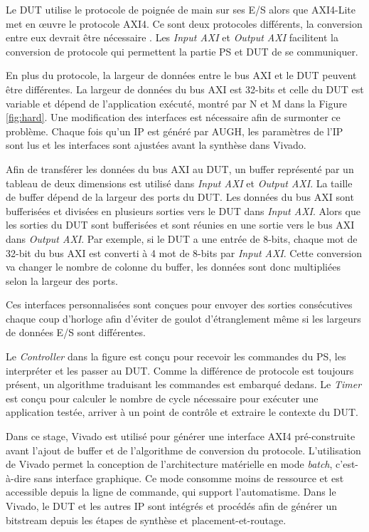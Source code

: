 Le DUT utilise le protocole de poignée de main sur ses E/S alors que AXI4-Lite met en œuvre le protocole AXI4.
Ce sont deux protocoles différents, la conversion entre eux devrait être nécessaire . Les \emph{Input AXI} et \emph{Output AXI}
facilitent la conversion de protocole qui permettent la partie PS et DUT de se communiquer. 

En plus du protocole, la largeur de données entre le bus AXI et le DUT peuvent être différentes.
La largeur de données du bus AXI est 32-bits et celle du DUT est variable et dépend de l'application
exécuté, montré par N et M dans la Figure \ref{fig:hard}. Une modification des interfaces est nécessaire afin
de surmonter ce problème. Chaque fois qu'un IP est généré par AUGH, les paramètres de l'IP sont
lus et les interfaces sont ajustées avant la synthèse dans Vivado. 

Afin de transférer les données du bus AXI au DUT, un buffer représenté par un tableau de deux dimensions est utilisé dans
\emph{Input AXI} et \emph{Output AXI}. La taille de buffer dépend de la largeur des ports du DUT. 
Les données du bus AXI sont bufferisées et divisées en plusieurs sorties vers le DUT dans \emph{Input AXI}.
Alors que les sorties du DUT sont bufferisées et sont réunies en une sortie vers le bus AXI dans \emph{Output AXI}.
Par exemple, si le DUT a une entrée de 8-bits, chaque mot de 32-bit du bus AXI est converti à 4 mot de 8-bits par 
\emph{Input AXI}. Cette conversion va changer le nombre de colonne du buffer, les données sont donc multipliées
selon la largeur des ports.

Ces interfaces personnalisées sont conçues pour envoyer des sorties consécutives chaque coup d'horloge
afin d'éviter de goulot d'étranglement même si les largeurs de données E/S sont différentes.

Le \emph{Controller} dans la figure est conçu pour recevoir les commandes du PS, les interpréter et les passer au DUT.
Comme la différence de protocole est toujours présent, un algorithme traduisant les commandes est embarqué dedans.
Le \emph{Timer} est conçu pour calculer le nombre de cycle nécessaire pour exécuter une application testée,
arriver à un point de contrôle et extraire le contexte du DUT.

Dans ce stage, Vivado est utilisé pour générer une interface AXI4 pré-construite avant l'ajout de buffer et de l'algorithme
de conversion du protocole.
L'utilisation de Vivado permet la conception de l'architecture matérielle en mode \emph{batch}, c'est-à-dire sans interface
graphique. Ce mode consomme moins de ressource et est accessible depuis la ligne de commande, qui 
support l'automatisme. Dans le Vivado, le DUT et les autres IP sont intégrés et procédés afin de générer un bitstream
depuis les étapes de synthèse et placement-et-routage.


